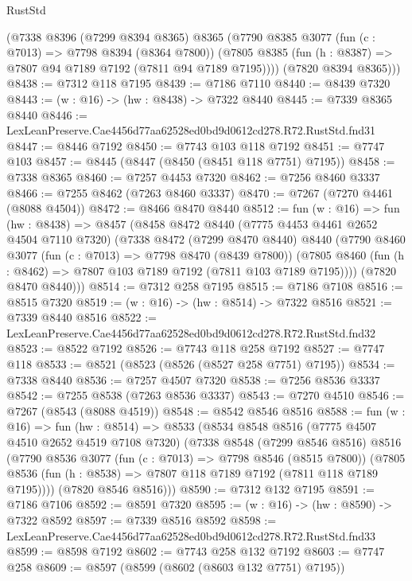 \begin{lexlean}{RustStd}
\begin{coremodule}
      (@7338
        @8396
        (@7299 @8394 @8365)
        @8365
        (@7790
          @8385
          @3077
          (fun (c : @7013) => @7798 @8394 (@8364 @7800))
          (@7805 @8385 (fun (h : @8387) => @7807 @94 @7189 @7192 (@7811 @94 @7189 @7195))))
        (@7820 @8394 @8365)))
@8438 := @7312 @118 @7195
@8439 := @7186 @7110
@8440 := @8439 @7320
@8443 := (w : @16) -> (hw : @8438) -> @7322 @8440
@8445 := @7339 @8365 @8440
@8446 := LexLeanPreserve.Cae4456d77aa62528ed0bd9d0612cd278.R72.RustStd.fnd31
@8447 := @8446 @7192
@8450 := @7743 @103 @118 @7192
@8451 := @7747 @103
@8457 := @8445 (@8447 (@8450 (@8451 @118 @7751) @7195))
@8458 := @7338 @8365
@8460 := @7257 @4453 @7320
@8462 := @7256 @8460 @3337
@8466 := @7255 @8462 (@7263 @8460 @3337)
@8470 := @7267 (@7270 @4461 (@8088 @4504))
@8472 := @8466 @8470 @8440
@8512 := fun (w : @16) =>
  fun (hw : @8438) =>
  @8457
    (@8458
      @8472
      @8440
      (@7775 @4453 @4461 @2652 @4504 @7110 @7320)
      (@7338
        @8472
        (@7299 @8470 @8440)
        @8440
        (@7790
          @8460
          @3077
          (fun (c : @7013) => @7798 @8470 (@8439 @7800))
          (@7805 @8460 (fun (h : @8462) => @7807 @103 @7189 @7192 (@7811 @103 @7189 @7195))))
        (@7820 @8470 @8440)))
@8514 := @7312 @258 @7195
@8515 := @7186 @7108
@8516 := @8515 @7320
@8519 := (w : @16) -> (hw : @8514) -> @7322 @8516
@8521 := @7339 @8440 @8516
@8522 := LexLeanPreserve.Cae4456d77aa62528ed0bd9d0612cd278.R72.RustStd.fnd32
@8523 := @8522 @7192
@8526 := @7743 @118 @258 @7192
@8527 := @7747 @118
@8533 := @8521 (@8523 (@8526 (@8527 @258 @7751) @7195))
@8534 := @7338 @8440
@8536 := @7257 @4507 @7320
@8538 := @7256 @8536 @3337
@8542 := @7255 @8538 (@7263 @8536 @3337)
@8543 := @7270 @4510
@8546 := @7267 (@8543 (@8088 @4519))
@8548 := @8542 @8546 @8516
@8588 := fun (w : @16) =>
  fun (hw : @8514) =>
  @8533
    (@8534
      @8548
      @8516
      (@7775 @4507 @4510 @2652 @4519 @7108 @7320)
      (@7338
        @8548
        (@7299 @8546 @8516)
        @8516
        (@7790
          @8536
          @3077
          (fun (c : @7013) => @7798 @8546 (@8515 @7800))
          (@7805 @8536 (fun (h : @8538) => @7807 @118 @7189 @7192 (@7811 @118 @7189 @7195))))
        (@7820 @8546 @8516)))
@8590 := @7312 @132 @7195
@8591 := @7186 @7106
@8592 := @8591 @7320
@8595 := (w : @16) -> (hw : @8590) -> @7322 @8592
@8597 := @7339 @8516 @8592
@8598 := LexLeanPreserve.Cae4456d77aa62528ed0bd9d0612cd278.R72.RustStd.fnd33
@8599 := @8598 @7192
@8602 := @7743 @258 @132 @7192
@8603 := @7747 @258
@8609 := @8597 (@8599 (@8602 (@8603 @132 @7751) @7195))

\end{coremodule}
\end{lexlean}
